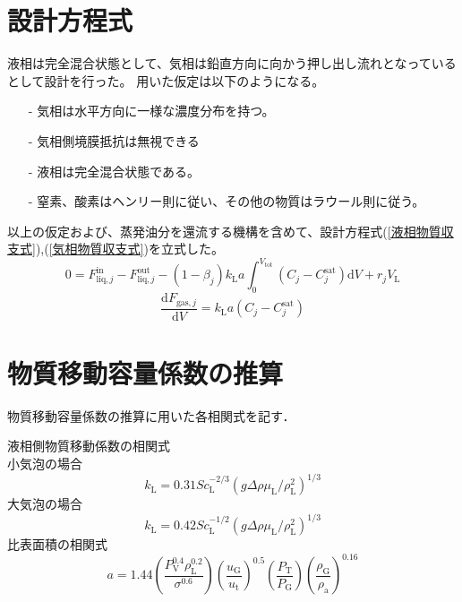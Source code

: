 \documentclass[a4j]{jsreport}
\begin{document}
\section{設計方程式}
液相は完全混合状態として、気相は鉛直方向に向かう押し出し流れとなっているとして設計を行った。
用いた仮定は以下のようになる。
\begin{itemize}
    \item[-] 気相は水平方向に一様な濃度分布を持つ。
    \item[-] 気相側境膜抵抗は無視できる
    \item[-] 液相は完全混合状態である。
    \item[-] 窒素、酸素はヘンリー則に従い、その他の物質はラウール則に従う。
\end{itemize}
以上の仮定および、蒸発油分を還流する機構を含めて、設計方程式(\ref{液相物質収支式}),(\ref{気相物質収支式})を立式した。\\
\begin{equation}
    \label{液相物質収支式}
    0=F^{\mathrm{ in}}_{\mathrm{ liq},j}-F^{\mathrm{ out}}_{\mathrm{ liq},j} -(1-\beta_j) k_{\mathrm{ L}}a
    \int^{V_{\mathrm{ tot}}}_0(C_j - C^{\mathrm{ sat}}_j)\mathrm{ d}V + r_j V_{\mathrm{ L}}
\end{equation}
\begin{equation}
    \label{気相物質収支式}
    \frac{\mathrm{ d}F_{\mathrm{ gas},j}}{\mathrm{ d}V} = k_{\mathrm{ L}}a(C_j - C^{\mathrm{ sat}}_j)
\end{equation}

\section{物質移動容量係数の推算}
物質移動容量係数の推算に用いた各相関式を記す．

液相側物質移動係数の相関式\\
小気泡の場合
\begin{equation}
    k_{\mathrm{ L}} = 0.31Sc_{\mathrm{ L}}^{-2/3}(g \Delta \rho \mu_{\mathrm{ L}}/\rho_{\mathrm{ L}}^2)^{1/3}
\end{equation}
大気泡の場合
\begin{equation}
    k_{\mathrm{ L}} = 0.42Sc_{\mathrm{ L}}^{-1/2}(g \Delta \rho \mu_{\mathrm{ L}}/\rho_{\mathrm{ L}}^2)^{1/3}
\end{equation}
比表面積の相関式
\begin{equation}
    a = 1.44(\frac{P_{\mathrm{ V}}^{0.4} \rho_{\mathrm{ L}}^{0.2} }{ \sigma^{0.6}})(\frac{u_{\mathrm{ G}}}{u_{\mathrm{ t}}})^{0.5}(\frac{P_{\mathrm{ T}}}{P_{\mathrm{ G}}})(\frac{\rho_{\mathrm{ G}}}{\rho_{\mathrm{ a}}})^{0.16}
\end{equation}
\end{document}
